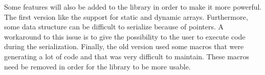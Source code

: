 Some features will also be added to the library in order to make it more
powerful. The first version like the support for static and dynamic arrays.
Furthermore, some data structure can be difficult to serialize because of
pointers. A workaround to this issue is to give the possibility to the user to
execute code during the serialization. Finally, the old version used some macros
that were generating a lot of code and that was very difficult to maintain.
These macros need be removed in order for the library to be more usable.
